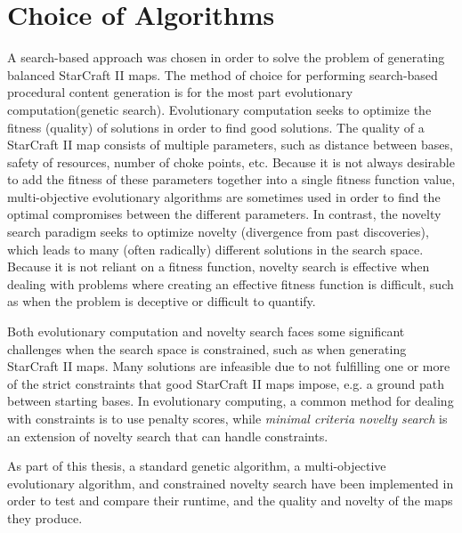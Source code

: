 \section{Choice of Algorithms}
\label{methodology_algorithmchoice}
A search-based approach was chosen in order to solve the problem of generating balanced StarCraft II maps. The method of choice for performing search-based procedural content generation is for the most part evolutionary computation\cite{togelius2011search}(genetic search). Evolutionary computation seeks to optimize the fitness (quality) of solutions in order to find good solutions. The quality of a StarCraft II map consists of multiple parameters, such as distance between bases, safety of resources, number of choke points, etc. Because it is not always desirable to add the fitness of these parameters together into a single fitness function value, multi-objective evolutionary algorithms are sometimes used in order to find the optimal compromises between the different parameters. In contrast, the novelty search paradigm seeks to optimize novelty (divergence from past discoveries), which leads to many (often radically) different solutions in the search space. Because it is not reliant on a fitness function, novelty search is effective when dealing with problems where creating an effective fitness function is difficult, such as when the problem is deceptive or difficult to quantify.

Both evolutionary computation and novelty search faces some significant challenges when the search space is constrained\cite{liapis2014constrained}, such as when generating StarCraft II maps. Many solutions are infeasible due to not fulfilling one or more of the strict constraints that good StarCraft II maps impose, e.g. a ground path between starting bases. In evolutionary computing, a common method for dealing with constraints is to use penalty scores, while \textit{minimal criteria novelty search} is an extension of novelty search that can handle constraints.

As part of this thesis, a standard genetic algorithm, a multi-objective evolutionary algorithm, and constrained novelty search have been implemented in order to test and compare their runtime, and the quality and novelty of the maps they produce.